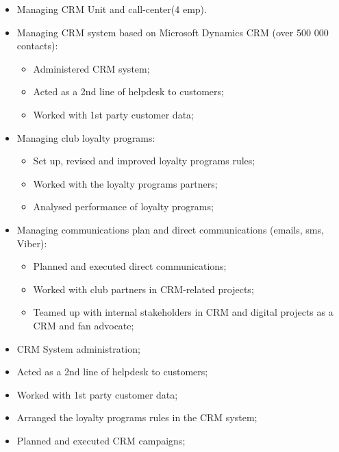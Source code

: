 \documentclass[11pt,a4paper,sans]{moderncv}
\begin{document}
\begin{itemize}
\item Managing CRM Unit and call-center(4 emp).
\item Managing CRM system based on Microsoft Dynamics CRM (over 500 000 contacts):
	\begin{itemize}
	\item Administered CRM system;
	\item Acted as a 2nd line of helpdesk to customers;
	\item Worked with 1st party customer data;
	\end{itemize}
\item Managing club loyalty programs:
	\begin{itemize}
	\item Set up, revised and improved loyalty programs rules;
	\item Worked with the loyalty programs partners;
	\item Analysed performance of loyalty programs;
	\end{itemize}
\item Managing communications plan and direct communications (emails, sms, Viber):
	\begin{itemize}
	\item Planned and executed direct communications;
	\item Worked with club partners in CRM-related projects;
	\item Teamed up with internal stakeholders in CRM and digital projects as a CRM and fan advocate;\newline{}
	\end{itemize}
\end{itemize}


\begin{itemize}
\item CRM System administration;
\item Acted as a 2nd line of helpdesk to customers;
\item Worked with 1st party customer data;
\item Arranged the loyalty programs rules in the CRM system;
\item Planned and executed CRM campaigns;\newline{}
\end{itemize}
\end{document}
